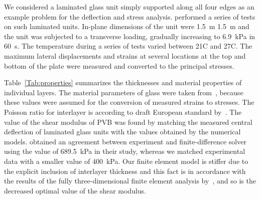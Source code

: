 \documentclass[11pt]{article}
\newcommand{\Tref}[1]{Table~\ref{#1}}
\begin{document}
We considered a laminated glass unit simply supported along all four edges as an example problem for the deflection and stress analysis. \cite{Vallabhan:1993:ALG} performed a series of tests on such laminated units. In-plane dimensions of the unit were 1.5~m  1.5~m and the unit was subjected to a transverse loading,  gradually increasing to 6.9~kPa in 60~s. The temperature during a series of tests varied between 21C and 27C. The maximum lateral displacements and strains at several locations at the top and bottom of the plate were measured and converted to the principal stresses.

\Tref{Tab:properties} summarizes the thicknesses and material properties of individual layers. The material parameters of glass were taken from~\cite{Vallabhan:1993:ALG}, because these values were assumed for the conversion of measured strains to stresses. The Poisson ratio for interlayer is according to draft European standard by~\cite{prEN16613}. The value of the shear modulus of PVB was found by matching the measured central deflection of laminated glass units with the values obtained by the numerical models. \cite{Vallabhan:1993:ALG} obtained an agreement between experiment and finite-difference solver using the value of 689.5~kPa in their study, whereas we matched experimental data with a smaller value of 400~kPa. Our finite element model is stiffer due to the explicit inclusion of interlayer thickness and this fact is in accordance with the results of the fully three-dimensional finite element analysis by~\cite{Duser:1999:AGBL}, and so is the decreased optimal value of the shear modulus.

\begin{table}[ht]
\caption{Properties of glass and PVB layers}
\label{Tab:properties}
\end{table}
\end{document}
